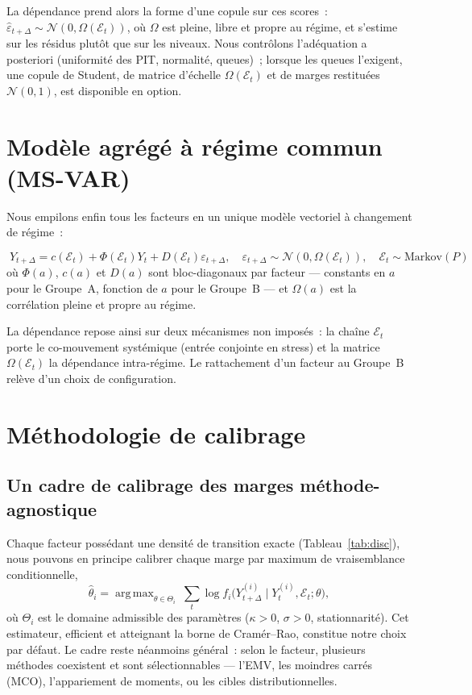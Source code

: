\documentclass[11pt,a4paper]{article}
\theoremstyle{definition}
\DeclareMathOperator*{\argmax}{arg\,max}
\newcommand{\Ecal}{\mathcal{E}}
\newcommand{\Ncal}{\mathcal{N}}
\newcommand{\eps}{\varepsilon}
\newcommand{\Dt}{\Delta}
\begin{document}
La dépendance prend alors la forme d'une copule sur ces scores~: $\widehat\eps_{t+\Dt}\sim\Ncal(0,\Omega(\Ecal_t))$, où $\Omega$ est pleine, libre et propre au régime, et s'estime sur les résidus plutôt que sur les niveaux. Nous contrôlons l'adéquation a posteriori (uniformité des PIT, normalité, queues)~; lorsque les queues l'exigent, une copule de Student, de matrice d'échelle $\Omega(\Ecal_t)$ et de marges restituées $\Ncal(0,1)$, est disponible en option.

\section{Modèle agrégé à régime commun (MS-VAR)}
\label{sec:msvar}
Nous empilons enfin tous les facteurs en un unique modèle vectoriel à changement de régime~:
\begin{definitionbox}
\[
\boxed{\;Y_{t+\Dt}=c(\Ecal_t)+\Phi(\Ecal_t)Y_t+D(\Ecal_t)\eps_{t+\Dt},\quad \eps_{t+\Dt}\sim\Ncal(0,\Omega(\Ecal_t)),\quad \Ecal_t\sim\text{Markov}(P)\;}
\]
où $\Phi(a)$, $c(a)$ et $D(a)$ sont bloc-diagonaux par facteur --- constants en $a$ pour le Groupe~A, fonction de $a$ pour le Groupe~B --- et $\Omega(a)$ est la corrélation pleine et propre au régime.
\end{definitionbox}
\noindent La dépendance repose ainsi sur deux mécanismes non imposés~: la chaîne $\Ecal_t$ porte le co-mouvement systémique (entrée conjointe en stress) et la matrice $\Omega(\Ecal_t)$ la dépendance intra-régime. Le rattachement d'un facteur au Groupe~B relève d'un choix de configuration.

\section{Méthodologie de calibrage}
\label{sec:calib}

\subsection{Un cadre de calibrage des marges méthode-agnostique}
Chaque facteur possédant une densité de transition exacte (Tableau~\ref{tab:disc}), nous pouvons en principe calibrer chaque marge par maximum de vraisemblance conditionnelle,
\[
\hat\theta_i=\argmax_{\theta\in\Theta_i}\ \sum_t\log f_i\big(Y^{(i)}_{t+\Dt}\mid Y^{(i)}_t,\Ecal_t;\theta\big),
\]
où $\Theta_i$ est le domaine admissible des paramètres ($\kappa>0$, $\sigma>0$, stationnarité). Cet estimateur, efficient et atteignant la borne de Cramér--Rao, constitue notre choix par défaut. Le cadre reste néanmoins général~: selon le facteur, plusieurs méthodes coexistent et sont sélectionnables --- l'EMV, les moindres carrés (MCO), l'appariement de moments, ou les cibles distributionnelles.
\end{document}
